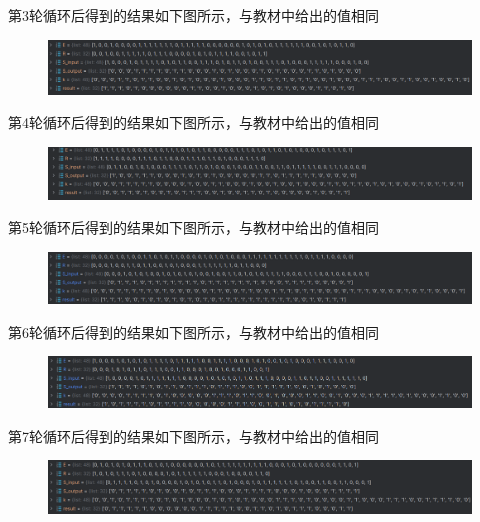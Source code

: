\documentclass[a4paper,11pt,UTF8]{ctexart}
\newcommand{\bottomcaption}{%
\setlength{\abovecaptionskip}{6pt}%
\setlength{\belowcaptionskip}{6pt}%
\caption}
\newcommand{\xiaowuhao}{\fontsize{9pt}{\baselineskip}\selectfont}   %
\begin{document}
            第3轮循环后得到的结果如下图所示，与教材中给出的值相同
            \begin{figure}[H]
                \centering
                \includegraphics[width=15cm]{dN3.png}
                \bottomcaption{\xiaowuhao{第3轮循环的结果}}
            \end{figure}
            第4轮循环后得到的结果如下图所示，与教材中给出的值相同
            \begin{figure}[H]
                \centering
                \includegraphics[width=15cm]{dN4.png}
                \bottomcaption{\xiaowuhao{第4轮循环的结果}}
            \end{figure}
            第5轮循环后得到的结果如下图所示，与教材中给出的值相同
            \begin{figure}[H]
                \centering
                \includegraphics[width=15cm]{dN5.png}
                \bottomcaption{\xiaowuhao{第5轮循环的结果}}
            \end{figure}
            第6轮循环后得到的结果如下图所示，与教材中给出的值相同
            \begin{figure}[H]
                \centering
                \includegraphics[width=15cm]{dN6.png}
                \bottomcaption{\xiaowuhao{第6轮循环的结果}}
            \end{figure}
\newpage
            第7轮循环后得到的结果如下图所示，与教材中给出的值相同
            \begin{figure}[H]
                \centering
                \includegraphics[width=15cm]{dN7.png}
                \bottomcaption{\xiaowuhao{第7轮循环的结果}}
            \end{figure}
\end{document}

